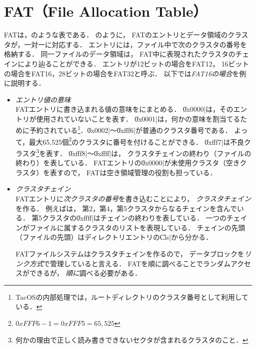 \section{FAT（File Allocation Table）}
FATは，のような表である．
のように，
FATのエントリとデータ領域のクラスタが，一対一に対応する．
エントリには，ファイル中で次のクラスタの番号を格納する．
同一ファイルのデータ領域は，
FAT中に表現されたクラスタのチェインにより辿ることができる．
エントリが12ビットの場合をFAT12，
16ビットの場合をFAT16，28ビットの場合をFAT32と呼ぶ．
以下では\emph{FAT16の場合}を例に説明する．

\begin{itemize}
\item \emph{エントリ値の意味} \\
  FATエントリに書き込まれる値の意味をにまとめる．
  \|0x0000|は，そのエントリが使用されていないことを表す．
  \|0x0001|は，何かの意味を割当てるために予約されている\footnote{
    TacOSの内部処理では，ルートディレクトリのクラスタ番号として利用している．
  }．\|0x0002|〜\|0xfff6|が普通のクラスタ番号である．
  よって，最大65,525個\footnote{
    $0xFFF6 - 1 = 0xFFF5 = 65,525$
  }のクラスタに番号を付けることができる．
  \|0xfff7|は不良クラスタ\footnote{
    何かの理由で正しく読み書きできないセクタが含まれるクラスタのこと．
  }を表す．
  \|0xfff8|〜\|0xffff|は，
  クラスタチェインの終わり（ファイルの終わり）を表している．
  FATエントリの\|0x0000|が未使用クラスタ（空きクラスタ）を表すので，
  FATは空き領域管理の役割も担っている．

\item \emph{クラスタチェイン} \\
  FATエントリに\emph{次クラスタの番号}を書き込むことにより，
  \emph{クラスタチェイン}を作る．
  例えばは，
  第2，第4，第5クラスタからなるチェインを含んでいる．
  第5クラスタの\|0xffff|はチェインの終わりを表している．
  一つのチェインがファイルに属するクラスタのリストを表現している．
  チェインの先頭（ファイルの先頭）はディレクトリエントリの\|Cls|から分かる．

  FATファイルシステムはクラスタチェインを作るので，
  データブロックを\emph{リンク方式}で管理していると言える．
  FATを順に調べることでランダムアクセスができるが，
  \emph{順に}調べる必要がある．

\end{itemize}

